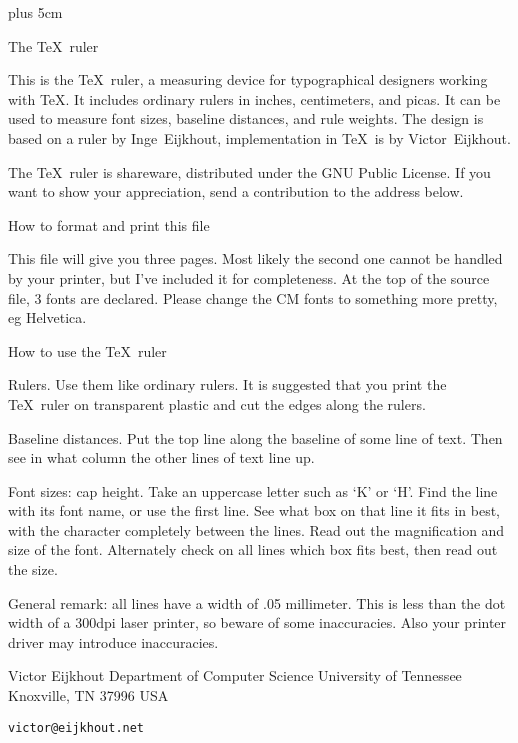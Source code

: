 \begin{fullwidth}
\def\opskip{\vskip.5mm\relax}
\let\neerskip\opskip

\output{}

\begingroup\hsize=12cm \vsize=8in
\parindent=0pt \parskip=6pt
\rightskip=0cm plus 5cm \normalbaselines

\hbox{}\vskip3cm
\big The \TeX\ ruler

\manual
This is the \TeX\ ruler, a measuring device for
typographical designers working with \TeX. It includes ordinary
rulers in inches, centimeters, and picas.
It can be used to measure font sizes, baseline distances,
and rule weights. The design is based on a ruler
by Inge~Eijkhout, implementation in \TeX\ is by 
Victor~Eijkhout.

The \TeX\ ruler is shareware, distributed under the GNU Public License.
If you want to show your appreciation, send a contribution
to the address below.

How to format and print this file

This file will give you three pages. Most likely the second one
cannot be handled by your printer, but I've included it for
completeness. At the top of the source file, 3 fonts are
declared. Please change the CM fonts to something more pretty,
eg Helvetica.

How to use the \TeX\ ruler

Rulers. Use them like ordinary rulers. It is suggested
that you print the \TeX\ ruler on transparent plastic and
cut the edges along the rulers.

Baseline distances. Put the top line along the baseline
of some line of text. Then see in what column the other
lines of text line up.

Font sizes: cap height. Take an uppercase letter
such as `K' or `H'. Find the line with its font name,
or use the first line. See what box on that line
it fits in best, with the character completely between
the lines. Read out the magnification and size of the
font. Alternately check on all lines which box fits
best, then read out the size.

General remark: all lines have a width of .05 millimeter. 
This is less than the dot width of a 300dpi
laser printer, so beware of some inaccuracies.
Also your printer driver may introduce 
inaccuracies.

\leavevmode
{\obeylines \parskip=0pt %
Victor Eijkhout
Department of Computer Science
University of Tennessee
Knoxville, TN 37996
USA\par {\tt victor@eijkhout.net}}


\end{fullwidth}
